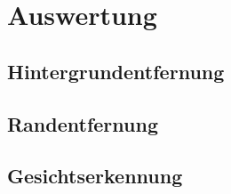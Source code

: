 \chapter{Auswertung}
\section{Hintergrundentfernung}

\section{Randentfernung}

\section{Gesichtserkennung}
